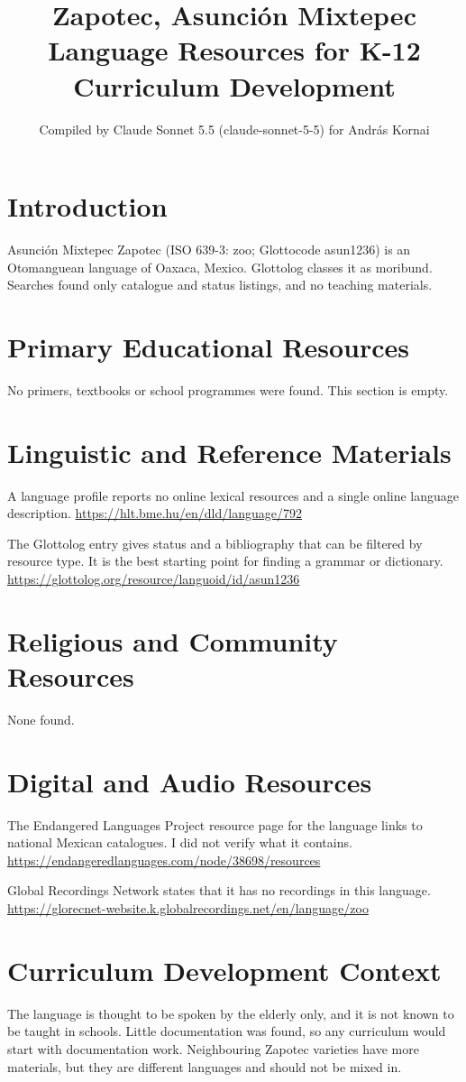 \documentclass[12pt]{article}
\title{Zapotec, Asunci\'on Mixtepec Language Resources for K-12 Curriculum Development}
\author{Compiled by Claude Sonnet 5.5 (claude-sonnet-5-5) for Andr\'as Kornai}
\date{}
\begin{document}
\maketitle

\section{Introduction}
Asunci\'on Mixtepec Zapotec (ISO 639-3: zoo; Glottocode asun1236) is an Otomanguean language of Oaxaca, Mexico. Glottolog classes it as moribund. Searches found only catalogue and status listings, and no teaching materials.

\section{Primary Educational Resources}
No primers, textbooks or school programmes were found. This section is empty.

\section{Linguistic and Reference Materials}
A language profile reports no online lexical resources and a single online language description. \url{https://hlt.bme.hu/en/dld/language/792}

The Glottolog entry gives status and a bibliography that can be filtered by resource type. It is the best starting point for finding a grammar or dictionary. \url{https://glottolog.org/resource/languoid/id/asun1236}

\section{Religious and Community Resources}
None found.

\section{Digital and Audio Resources}
The Endangered Languages Project resource page for the language links to national Mexican catalogues. I did not verify what it contains. \url{https://endangeredlanguages.com/node/38698/resources}

Global Recordings Network states that it has no recordings in this language. \url{https://glorecnet-website.k.globalrecordings.net/en/language/zoo}

\section{Curriculum Development Context}
The language is thought to be spoken by the elderly only, and it is not known to be taught in schools. Little documentation was found, so any curriculum would start with documentation work. Neighbouring Zapotec varieties have more materials, but they are different languages and should not be mixed in.
\end{document}
